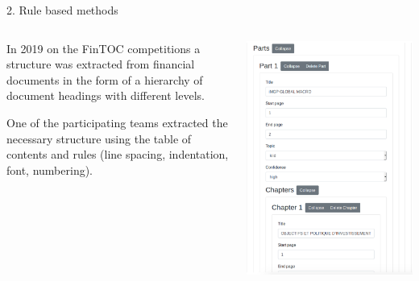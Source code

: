 \documentclass{beamer}
\begin{document}
\begin{frame}{2. Rule based methods}
    \begin{columns}
        \begin{column}{0.5\textwidth}
        In 2019 on the FinTOC competitions a structure was extracted from financial documents in the form of a hierarchy of document headings with different levels.
        
        One of the participating teams extracted the necessary structure using the table of contents and rules (line spacing, indentation, font, numbering).
        \end{column}
        \begin{column}{0.5\textwidth}
        \includegraphics[width=\textwidth]{pics/rulebased.png}
        \end{column}
    \end{columns}
\end{frame}
\end{document}
